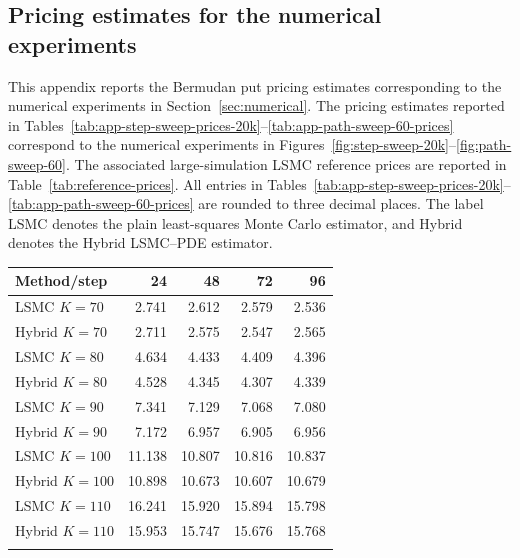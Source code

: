 \documentclass[pdflatex,sn-mathphys-num]{sn-jnl}
\makeatletter
\theoremstyle{thmstyleone}%
\theoremstyle{thmstylethree}%
\theoremstyle{thmstyletwo}%
\renewenvironment{table}[1][]{%
  \par\addvspace{12pt}%
  \noindent\begin{minipage}{\textwidth}%
  \def\@captype{table}%
  \centering%
  \tablebodyfont%
}{%
  \end{minipage}%
  \par\addvspace{12pt}%
}
\makeatother
\begin{document}
\begin{appendices}
\section{Pricing estimates for the numerical experiments}\label{app:price-grids}
This appendix reports the Bermudan put pricing estimates corresponding to the numerical experiments in Section~\ref{sec:numerical}. The pricing estimates reported in Tables~\ref{tab:app-step-sweep-prices-20k}--\ref{tab:app-path-sweep-60-prices} correspond to the numerical experiments in Figures~\ref{fig:step-sweep-20k}--\ref{fig:path-sweep-60}. The associated large-simulation LSMC reference prices are reported in Table~\ref{tab:reference-prices}. All entries in Tables~\ref{tab:app-step-sweep-prices-20k}--\ref{tab:app-path-sweep-60-prices} are rounded to three decimal places. The label LSMC denotes the plain least-squares Monte Carlo estimator, and Hybrid denotes the Hybrid LSMC--PDE estimator. 



\begin{table}[htbp]
\centering
\caption{Pricing estimates in the fixed-path step-sweep experiment with $20{,}000$ paths. Prices are rounded to three decimal places.}
\label{tab:app-step-sweep-prices-20k}
\footnotesize
\setlength{\tabcolsep}{3pt}
\begin{tabular}{lrrrr}
\toprule
Method/step & 24 & 48 & 72 & 96 \\
\midrule
LSMC $K=70$ & 2.741 & 2.612 & 2.579 & 2.536 \\
Hybrid $K=70$ & 2.711 & 2.575 & 2.547 & 2.565 \\
LSMC $K=80$ & 4.634 & 4.433 & 4.409 & 4.396 \\
Hybrid $K=80$ & 4.528 & 4.345 & 4.307 & 4.339 \\
LSMC $K=90$ & 7.341 & 7.129 & 7.068 & 7.080 \\
Hybrid $K=90$ & 7.172 & 6.957 & 6.905 & 6.956 \\
LSMC $K=100$ & 11.138 & 10.807 & 10.816 & 10.837 \\
Hybrid $K=100$ & 10.898 & 10.673 & 10.607 & 10.679 \\
LSMC $K=110$ & 16.241 & 15.920 & 15.894 & 15.798 \\
Hybrid $K=110$ & 15.953 & 15.747 & 15.676 & 15.768 \\
\botrule
\end{tabular}
\end{table}


\end{appendices}
\end{document}
